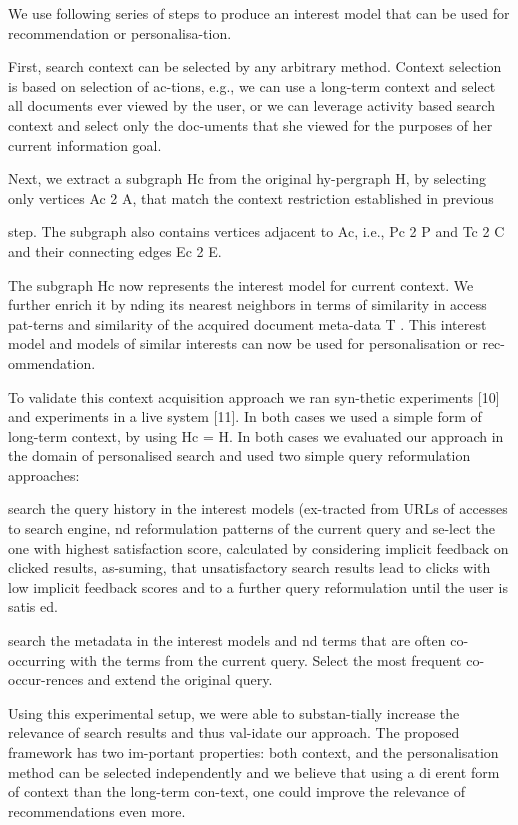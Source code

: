 \documentclass{acm_proc_article-sp} %
\begin{document}
We use following series of steps to produce an interest model that can be used for recommendation or personalisa-tion.

First, search context can be selected by any arbitrary method. Context selection is based on selection of ac-tions, e.g., we can use a long-term context and select all documents ever viewed by the user, or we can leverage activity based search context and select only the doc-uments that she viewed for the purposes of her current information goal. 

Next, we extract a subgraph Hc from the original hy-pergraph H, by selecting only vertices Ac 2 A, that match the context restriction established in previous 

step. The subgraph also contains vertices adjacent to Ac, i.e., Pc 2 P and Tc 2 C and their connecting edges 
Ec 2 E. 

The subgraph Hc now represents the interest model for current context. We further enrich it by nding its nearest neighbors in terms of similarity in access pat-terns and similarity of the acquired document meta-data T . This interest model and models of similar interests can now be used for personalisation or rec-ommendation. 

To validate this context acquisition approach we ran syn-thetic experiments [10] and experiments in a live system [11]. In both cases we used a simple form of long-term context, by using Hc = H. In both cases we evaluated our approach in the domain of personalised search and used two simple query reformulation approaches:

search the query history in the interest models (ex-tracted from URLs of accesses to search engine, nd reformulation patterns of the current query and se-lect the one with highest satisfaction score, calculated by considering implicit feedback on clicked results, as-suming, that unsatisfactory search results lead to clicks with low implicit feedback scores and to a further query reformulation until the user is satis ed. 

search the metadata in the interest models and nd terms that are often co-occurring with the terms from the current query. Select the most frequent co-occur-rences and extend the original query. 

Using this experimental setup, we were able to substan-tially increase the relevance of search results and thus val-idate our approach. The proposed framework has two im-portant properties: both context, and the personalisation method can be selected independently and we believe that using a di erent form of context than the long-term con-text, one could improve the relevance of recommendations even more.
\end{document}
